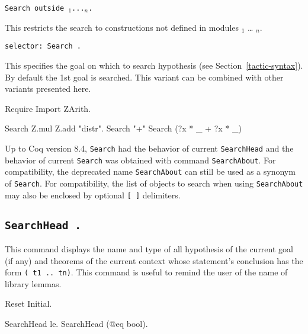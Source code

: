 \begin{Variants}
\item
  {\tt Search \nelist{{\termpatternorstr}}{}
     outside {\module$_1$}...{\module$_n$}.}

This restricts the search to constructions not defined in modules
{\module$_1$} \ldots{} {\module$_n$}.

\item {\tt selector: Search \nelist{\zeroone{-}{\termpatternorstr}}{}.}

  This specifies the goal on which to search hypothesis (see
  Section~\ref{tactic-syntax}). By default the 1st goal is searched.
  This variant can be combined with other variants presented here.
\end{Variants}

\examples

\begin{coq_example*}
Require Import ZArith.
\end{coq_example*}
\begin{coq_example}
Search Z.mul Z.add "distr".
Search "+"%
Search (?x * _ + ?x * _)%
\end{coq_example}

\Warning {} Up to Coq version 8.4, {\tt Search}
had the behavior of current {\tt SearchHead} and the behavior of
current {\tt Search} was obtained with command {\tt SearchAbout}. For
compatibility, the deprecated name {\tt SearchAbout} can still be used
as a synonym of {\tt Search}. For compatibility, the list of objects to
search when using {\tt SearchAbout} may also be enclosed by optional
{\tt [ ]} delimiters.

\subsection[\tt SearchHead {\term}.]{\tt SearchHead {\term}.}
This command displays the name and type of all hypothesis of the
current goal (if any) and theorems of the current context whose
statement's conclusion has the form {\tt ({\term} t1 ..
  tn)}.  This command is useful to remind the user of the name of
library lemmas.

\begin{coq_eval}
Reset Initial.
\end{coq_eval}

\begin{coq_example}
SearchHead le.
SearchHead (@eq bool).
\end{coq_example}

